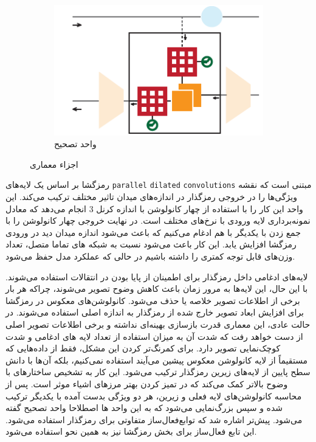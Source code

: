 \begin{figure}[ht]
\begin{subfigure}{0.45\textwidth}
		\includegraphics[width=\linewidth, height=0.2\textheight]{Images/Chapter3/SQNet_BRM.png}
		\caption{واحد تصحیح}
		\label{f65}
	\end{subfigure}
	\centering
	\caption{اجزاء معماری }
	\label{fig:fig8}
\end{figure}

رمزگشا بر اساس یک لایه‌های
\verb*|parallel|
\verb*|dilated|
\verb*|convolutions|
مبتنی است که نقشه ویژگی‌ها را در خروجی رمزگذار در اندازه‌های میدان تاثیر مختلف ترکیب می‌کند. این واحد این کار را با استفاده از چهار کانولوشن با اندازه کرنل 3 انجام می‌دهد که معادل نمونه‌برداری لایه ورودی با نرخ‌های مختلف است. در نهایت خروجی چهار کانولوشن را با جمع زدن با یکدیگر با هم ادغام می‌کنیم که باعث می‌شود اندازه میدان دید در ورودی رمزگشا افزایش یابد. این کار باعث می‌شود نسبت به شبکه های تماما متصل، تعداد وزن‌های قابل توجه کمتری را داشته باشیم در حالی که عملکرد مدل حفظ می‌شود.

لایه‌های ادغامی داخل رمزگذار برای اطمینان از پایا بودن
در انتقالات استفاده می‌شوند. با این حال، این لایه‌ها به مرور زمان باعث کاهش وضوح تصویر می‌شوند، چراکه هر بار برخی از اطلاعات تصویر خلاصه یا حذف می‌شود. کانولوشن‌های معکوس
در رمزگشا برای افزایش ابعاد تصویر خارج شده از رمزگذار به اندازه اصلی استفاده می‌شوند. در حالت عادی، این معماری قدرت بازسازی بهینه‌ای نداشته و برخی اطلاعات تصویر اصلی از دست خواهد رفت که شدت آن به میزان استفاده از تعداد لایه های ادغامی و شدت کوچک‌نمایی تصویر دارد. برای کمرنگ‌تر کردن این مشکل، فقط از داده‌هایی که مستقیماً از لایه کانولوشن معکوس پیشین می‌آیند استفاده نمی‌کنیم، بلکه آن‌ها با دانش سطح پایین از لایه‌های زیرین رمزگذار ترکیب می‌شود. این کار به تشخیص ساختارهای با وضوح بالاتر کمک می‌کند که در تمیز کردن بهتر مرزهای اشیاء موثر است. پس از محاسبه کانولوشن‌های لایه فعلی و زیرین، هر دو ویژگی بدست آمده با یکدیگر ترکیب شده و سپس بزرگ‌نمایی می‌شود که به این واحد ها اصطلاحا واحد تصحیح
گفته می‌شود. پیش‌تر اشاره شد که توابع‌فعال‌ساز متفاوتی برای رمزگذار استفاده می‌شود. این تابع‌ فعال‌ساز برای بخش رمزگشا نیز به همین نحو استفاده می‌شود.

